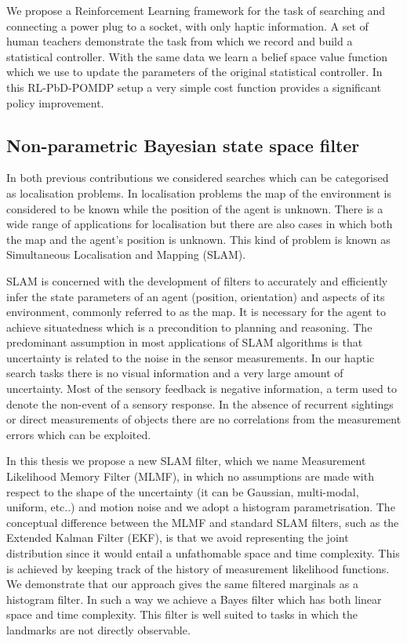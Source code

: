 We propose a Reinforcement Learning framework for the task of searching and connecting a power plug to a socket, 
with only haptic information. A set of human teachers demonstrate the task from which we record and build a 
statistical controller. With the same data we learn a belief space value function which we use to update
the parameters of the original statistical controller.
In this RL-PbD-POMDP setup a very simple cost function provides a significant policy improvement.

\subsection{Non-parametric Bayesian state space filter}\label{sub:contr3}


In both previous contributions we considered searches which can be categorised as localisation problems.
In localisation problems the map of the environment is considered to be known while the position of the agent is unknown.
There is a wide range of applications for localisation but there are also cases in which both the map  
and the agent's position is unknown. This kind of problem is known as Simultaneous Localisation and Mapping (SLAM).

SLAM is concerned with the development of filters to accurately and efficiently infer 
the state parameters of an agent (position, orientation) and aspects of its environment, commonly referred to as the map. 
It is necessary for the agent to achieve situatedness which is a precondition to planning and reasoning. The 
predominant assumption in most applications of SLAM algorithms is that uncertainty is related to the noise in the sensor measurements. In 
our haptic search tasks there is no visual information and a very large amount of uncertainty. Most of the sensory
feedback is negative information, a term used to denote the non-event of a sensory response.
In the absence of recurrent sightings or direct measurements of objects there are no correlations from the measurement errors 
which can be exploited. 

In this thesis we propose a new SLAM filter, which we name Measurement Likelihood Memory Filter (MLMF), in 
which no assumptions are made with respect to the shape of the uncertainty (it can be Gaussian, multi-modal, uniform, etc..) and 
motion noise and we adopt a histogram parametrisation. The conceptual difference between the MLMF and standard SLAM filters, 
such as the Extended Kalman Filter (EKF), is that we avoid representing the joint distribution since it would entail a unfathomable 
space and time complexity. 
This is achieved by keeping track of the history of measurement likelihood functions. We demonstrate that our approach gives 
the same filtered marginals as a histogram filter. In such a way we achieve a Bayes filter which has both linear space and 
time complexity. This filter is well suited to tasks in which the landmarks are not directly observable.

